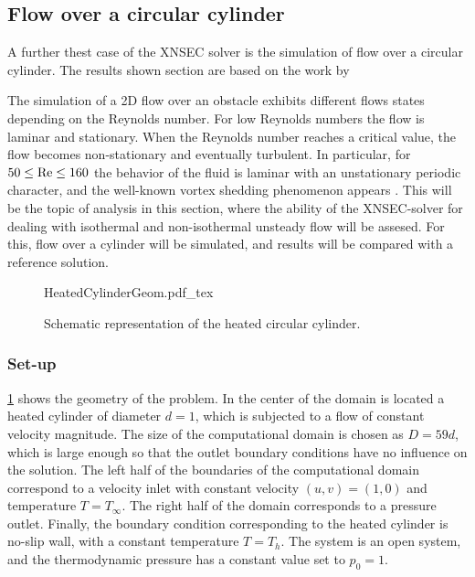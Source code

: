 \subsection{Flow over a circular cylinder}\label{ssec:FlowCircCyl}

A further thest case of the XNSEC solver is the simulation of flow over a circular cylinder. The results shown section are based on the work by \cite{miaoHighOrderSimulationLowMachFlows2022}

The simulation of a 2D flow over an obstacle exhibits different flows states depending on the Reynolds number. For low Reynolds numbers the flow is laminar and stationary. When the Reynolds number reaches a critical value, the flow becomes non-stationary and eventually turbulent. In particular, for $50 \leq \text{Re} \leq 160$ the behavior of the fluid is laminar with an unstationary periodic character, and the well-known vortex shedding phenomenon appears 	\cite{sharmaHEATFLUIDFLOW2004}. This will be the topic of analysis in this section, where the ability of the XNSEC-solver for dealing with isothermal and non-isothermal unsteady flow will be assesed. For this, flow over a cylinder will be simulated, and results will be compared with a reference solution. 
\begin{figure}[b!]
	\begin{center}
		\def\svgwidth{0.88\textwidth}
		{HeatedCylinderGeom.pdf_tex}
		\caption{Schematic representation of the heated circular cylinder.}
		\label{fig:CircularCylinderGeom}
	\end{center}
\end{figure}
\subsubsection{Set-up}
\cref{fig:CircularCylinderGeom} shows the geometry of the problem. In the center of the domain is located a heated cylinder of diameter $d = 1$, which is subjected to a flow of constant velocity magnitude. The size of the computational domain is chosen as $D = 59d$, which is large enough so that the outlet boundary conditions have no influence on the solution. The left half of the boundaries of the computational domain correspond to a velocity inlet with constant velocity $(u,v) = (1,0)$ and temperature $T = T_\infty$. The right half of the domain corresponds to a pressure outlet. Finally, the boundary condition corresponding to the heated cylinder is no-slip wall, with a constant temperature $T = T_h$. The system is an open system, and the thermodynamic pressure has a constant value set to $p_0 = 1$.

